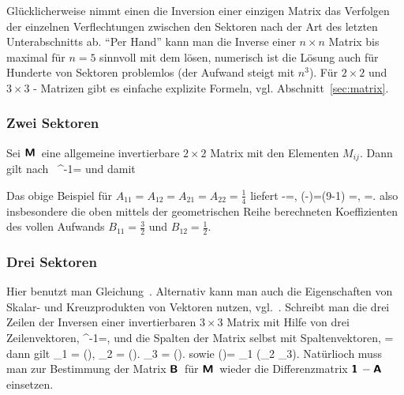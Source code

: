 Gl\"ucklicherweise nimmt einen die Inversion einer einzigen Matrix das
Verfolgen der einzelnen Verflechtungen zwischen den Sektoren nach der
Art des letzten Unterabschnitts ab. ``Per Hand'' kann man die Inverse
einer $n\times n$ Matrix 
bis maximal f\"ur $n=5$ sinnvoll mit dem  l\"osen, numerisch ist die L\"osung auch f\"ur
Hunderte von Sektoren problemlos (der Aufwand steigt mit $n^3$). F\"ur
 $2\times 2$ und $3\times 3$ - Matrizen gibt es einfache explizite
Formeln, vgl. Abschnitt~\ref{sec:matrix}.

\subsubsection{Zwei Sektoren}

Sei $\textbf{\textsf{M}}\,$ eine allgemeine invertierbare 
$2\times 2$ Matrix mit den Elementen $M_{ij}$. Dann
gilt nach~
\bdm
{}^{-1}=
\edm
und damit

Das obige Beispiel f\"ur $A_{11}=A_{12}=A_{21}=A_{22}=\frac{1}{4}$
liefert
\bdm
{}-=, \quad
{}\left(-\right)=(9-1)
=, \quad
{}=.
\edm
also insbesondere die oben mittels der geometrischen Reihe berechneten
Koeffizienten des vollen Aufwands $B_{11}=\frac{3}{2}$ und $B_{12}=\frac{1}{2}$.


\subsubsection{Drei Sektoren}

Hier benutzt man Gleichung~. Alternativ kann man
auch die Eigenschaften von Skalar- und Kreuzprodukten von
Vektoren nutzen, vgl.~.
Schreibt man die drei Zeilen der Inversen einer invertierbaren
$3\times 3$ Matrix mit Hilfe von drei Zeilenvektoren,
\bdm
{}^{-1}=,
\edm
und die Spalten der Matrix selbst mit Spaltenvektoren,
\bdm
{}=
\edm
dann gilt
\be
{}_1 =
{\left(\right)}, \quad
{}_2 =
{\left(\right)}.  \quad
{}_3 =
{\left(\right)}.
\ee
sowie
\be
\label{detDrei}
\left(\right)= _1 \cdot \left(_2 \times {}_3\right).
\ee
%
Nat\"urlioch muss man zur Bestimmung der Matrix $\textbf{\textsf{B}}\,$ 
 f\"ur $\textbf{\textsf{M}}\,$ wieder die Differenzmatrix
$\textbf{\textsf{1}}\,-\textbf{\textsf{A}}\,$ einsetzen.

